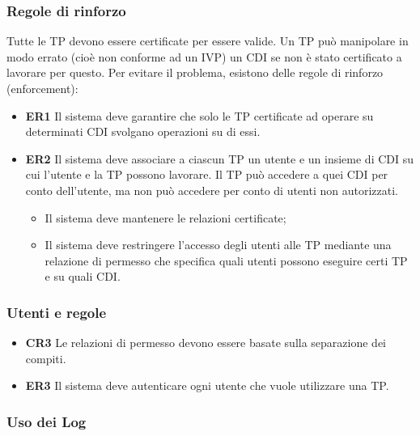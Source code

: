 \subsubsection{Regole di rinforzo}

Tutte le TP devono essere certificate per essere valide.
Un TP può manipolare in modo errato (cioè non conforme ad un IVP) un CDI se
non è stato
certificato a lavorare per questo. Per evitare il problema, esistono delle
regole di rinforzo
(enforcement):

\begin{itemize}
      \item \textbf{ER1} Il sistema deve garantire che solo le TP certificate ad
            operare su determinati CDI svolgano
            operazioni su di essi.
      \item \textbf{ER2} Il sistema deve associare a ciascun TP un utente e un
            insieme di CDI su cui l'utente e la TP possono lavorare. Il TP può
            accedere a quei CDI per conto dell'utente, ma non può accedere per conto di
            utenti non autorizzati.
            \begin{itemize}
                  \item Il sistema deve mantenere le relazioni certificate;
                  \item Il sistema deve restringere l'accesso degli utenti alle
                        TP mediante una relazione di
                        permesso che specifica quali utenti possono eseguire
                        certi TP e su quali CDI.
            \end{itemize}
\end{itemize}

\subsubsection{Utenti e regole}

\begin{itemize}
      \item \textbf{CR3} Le relazioni di permesso devono essere basate sulla
            separazione dei compiti.
      \item \textbf{ER3} Il sistema deve autenticare ogni utente che vuole
            utilizzare una TP.
\end{itemize}

\subsubsection{Uso dei Log}

